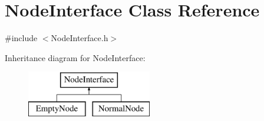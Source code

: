 \hypertarget{class_node_interface}{}\section{Node\+Interface Class Reference}
\label{class_node_interface}


{\ttfamily \#include $<$Node\+Interface.\+h$>$}

Inheritance diagram for Node\+Interface\+:\begin{figure}[H]
\begin{center}
\leavevmode
\includegraphics[height=2.000000cm]{class_node_interface}
\end{center}
\end{figure}
